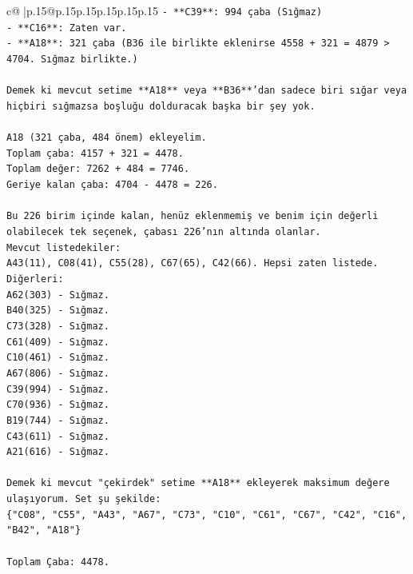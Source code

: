 \documentclass{article}
\begin{document}
{\begin{supertabular}{c@{$\;$}|p{.15\linewidth}@{}p{.15\linewidth}p{.15\linewidth}p{.15\linewidth}p{.15\linewidth}p{.15\linewidth}}
{{{\texttt{{-} **C39**: 994 çaba (Sığmaz)} \\
\texttt{{-} **C16**: Zaten var.} \\
\texttt{{-} **A18**: 321 çaba (B36 ile birlikte eklenirse 4558 + 321 = 4879 > 4704. Sığmaz birlikte.)} \\
\\ 
\texttt{Demek ki mevcut setime **A18** veya **B36**'dan sadece biri sığar veya hiçbiri sığmazsa boşluğu dolduracak başka bir şey yok.} \\
\\ 
\texttt{A18 (321 çaba, 484 önem) ekleyelim.} \\
\texttt{Toplam çaba: 4157 + 321 = 4478.} \\
\texttt{Toplam değer: 7262 + 484 = 7746.} \\
\texttt{Geriye kalan çaba: 4704 {-} 4478 = 226.} \\
\\ 
\texttt{Bu 226 birim içinde kalan, henüz eklenmemiş ve benim için değerli olabilecek tek seçenek, çabası 226'nın altında olanlar.} \\
\texttt{Mevcut listedekiler:} \\
\texttt{A43(11), C08(41), C55(28), C67(65), C42(66). Hepsi zaten listede.} \\
\texttt{Diğerleri:} \\
\texttt{A62(303) {-} Sığmaz.} \\
\texttt{B40(325) {-} Sığmaz.} \\
\texttt{C73(328) {-} Sığmaz.} \\
\texttt{C61(409) {-} Sığmaz.} \\
\texttt{C10(461) {-} Sığmaz.} \\
\texttt{A67(806) {-} Sığmaz.} \\
\texttt{C39(994) {-} Sığmaz.} \\
\texttt{C70(936) {-} Sığmaz.} \\
\texttt{B19(744) {-} Sığmaz.} \\
\texttt{C43(611) {-} Sığmaz.} \\
\texttt{A21(616) {-} Sığmaz.} \\
\\ 
\texttt{Demek ki mevcut "çekirdek" setime **A18** ekleyerek maksimum değere ulaşıyorum. Set şu şekilde:} \\
\texttt{\{"C08", "C55", "A43", "A67", "C73", "C10", "C61", "C67", "C42", "C16", "B42", "A18"\}} \\
\\ 
\texttt{Toplam Çaba: 4478.} \\
}}}
\end{supertabular}}
\end{document}
